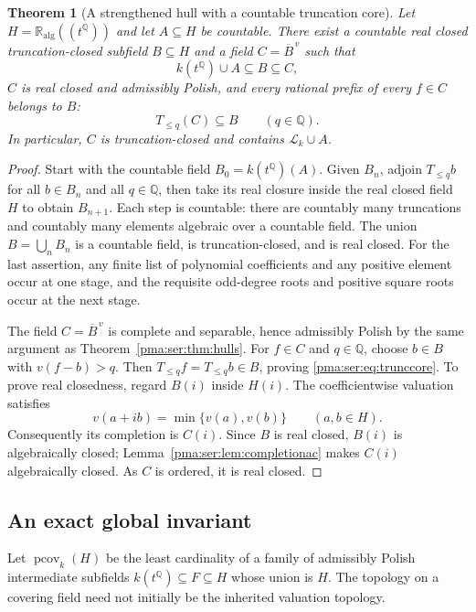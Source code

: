 \documentclass[11pt]{article}
\numberwithin{equation}{section}
\newtheorem{theorem}{Theorem}[section]
\theoremstyle{definition}
\theoremstyle{remark}
\newcommand{\Q}{\mathbb Q}
\newcommand{\ka}{\mathbb R_{\mathrm{alg}}}
\newcommand{\Lk}{\mathcal L_k}
\begin{document}
\begin{theorem}[A strengthened hull with a countable truncation core]
\label{pma:ser:thm:rchull}
Let $H=\ka((t^\Q))$ and let $A\subseteq H$ be countable. There exist a
countable real closed truncation-closed subfield $B\subseteq H$ and a field
$C=\overline B^{\,v}$ such that
\[
 k(t^\Q)\cup A\subseteq B\subseteq C,
\]
$C$ is real closed and admissibly Polish, and every rational prefix of every
$f\in C$ belongs to $B$:
\begin{equation}\label{pma:ser:eq:trunccore}
 T_{\leq q}(C)\subseteq B\qquad(q\in\Q).
\end{equation}
In particular, $C$ is truncation-closed and contains $\Lk\cup A$.
\end{theorem}
\begin{proof}
Start with the countable field $B_0=k(t^\Q)(A)$.
Given $B_n$, adjoin $T_{\leq q}b$ for all $b\in B_n$ and all $q\in\Q$,
then take its real closure inside the real closed field $H$ to obtain
$B_{n+1}$. Each step is countable: there are countably many truncations and
countably many elements algebraic over a countable field.
The union $B=\bigcup_nB_n$ is a countable field, is truncation-closed, and
is real closed. For the last assertion, any finite list of polynomial
coefficients and any positive element occur at one stage, and the requisite
odd-degree roots and positive square roots occur at the next stage.

The field $C=\overline B^{\,v}$ is complete and separable, hence admissibly
Polish by the same argument as Theorem~\ref{pma:ser:thm:hulls}.
For $f\in C$ and $q\in\Q$, choose $b\in B$ with $v(f-b)>q$.
Then $T_{\leq q}f=T_{\leq q}b\in B$, proving \eqref{pma:ser:eq:trunccore}.
To prove real closedness, regard $B(i)$ inside $H(i)$.
The coefficientwise valuation satisfies
\[
 v(a+ib)=\min\{v(a),v(b)\}\qquad(a,b\in H).
\]
Consequently its completion is $C(i)$. Since $B$ is real closed, $B(i)$ is
algebraically closed; Lemma~\ref{pma:ser:lem:completionac} makes $C(i)$ algebraically
closed. As $C$ is ordered, it is real closed.
\end{proof}

\subsection{An exact global invariant}

Let $\operatorname{pcov}_k(H)$ be the least cardinality of a family of
admissibly Polish intermediate subfields $k(t^\Q)\subseteq F\subseteq H$
whose union is $H$. The topology on a covering field need not initially be
the inherited valuation topology.
\end{document}
